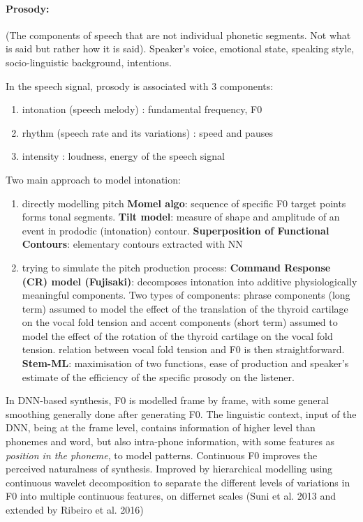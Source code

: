 \documentclass[12pt]{article}
\begin{document}
\paragraph{Prosody:} (The components of speech that are not individual phonetic segments. Not what is said but rather how it is said). Speaker’s voice, emotional state, speaking style, socio-linguistic background, intentions.

In the speech signal, prosody is associated with 3 components: \begin{enumerate}
\item intonation (speech melody) : fundamental frequency, F0
\item rhythm (speech rate and its variations) : speed and pauses
\item intensity : loudness, energy of the speech signal
\end{enumerate}
	

Two main approach to model intonation: \begin{enumerate}
\item directly modelling pitch
\textbf{Momel algo}: sequence of specific F0 target points forms tonal segments.
\textbf{Tilt model}: measure of shape and amplitude of an event in prododic (intonation) contour.
\textbf{Superposition of Functional Contours}: elementary contours extracted with NN

\item trying to simulate the pitch production process:
\textbf{Command Response (CR) model (Fujisaki)}: decomposes intonation into additive physiologically meaningful components. Two types of components: phrase components (long term) assumed to model the effect of the translation of the thyroid cartilage on the vocal fold tension and accent components (short term) assumed to model the effect of the rotation of the thyroid cartilage on the vocal fold tension. relation between vocal fold tension and F0 is then straightforward.
\textbf{Stem-ML}: maximisation of two functions, ease of production and speaker’s estimate of the efficiency of the specific prosody on the listener.
\end{enumerate}



In DNN-based synthesis, F0 is modelled frame by frame, with some general smoothing generally done after generating F0. 
The linguistic context, input of the DNN, being at the frame level, contains information of higher level than phonemes and word, but also intra-phone information, with some features as \textit{position in the phoneme}, to model patterns.
Continuous F0 improves the perceived naturalness of synthesis.
Improved by hierarchical modelling using continuous wavelet decomposition to separate the different levels of variations in F0 into multiple continuous features, on differnet scales (Suni et al. 2013 and extended by Ribeiro et al. 2016)
\end{document}
